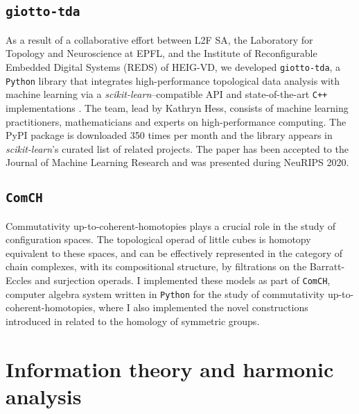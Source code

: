 \subsection{\texttt{giotto-tda}} As a result of a collaborative effort between L2F SA, the Laboratory for Topology and Neuroscience at EPFL, and the Institute of Reconfigurable Embedded Digital Systems (REDS) of HEIG-VD, we developed \texttt{giotto-tda}, a \texttt{Python} library that integrates high-performance topological data analysis with machine learning via a \emph{scikit-learn}--compatible API and state-of-the-art \texttt{C++} implementations \cite{medina2021giotto}. The team, lead by Kathryn Hess, consists of machine learning practitioners, mathematicians and experts on high-performance computing. The PyPI package is downloaded 350 times per month and the library appears in \emph{scikit-learn}'s curated list of related projects. The paper has been accepted to the Journal of Machine Learning Research and was presented during NeuRIPS 2020.

\subsection{\texttt{ComCH}} Commutativity up-to-coherent-homotopies plays a crucial role in the study of configuration spaces. The topological operad of little cubes is homotopy equivalent to these spaces, and can be effectively represented in the category of chain complexes, with its compositional structure, by filtrations on the Barratt-Eccles and surjection operads. I implemented these models as part of \texttt{ComCH}, computer algebra system written in \texttt{Python} for the study of commutativity up-to-coherent-homotopies, where I also implemented the novel constructions introduced in \cite{medina2020maysteenrod} related to the homology of symmetric groups.

\section{Information theory and harmonic analysis}

